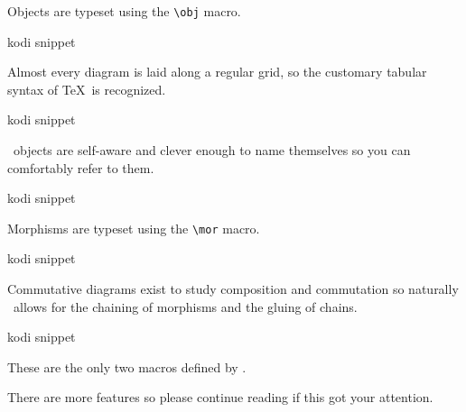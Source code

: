 Objects are typeset using the \lstinline|\obj| macro.

\begin{tcblisting}{kodi snippet}
\nilstrut{}
\end{tcblisting}

Almost every diagram is laid along a regular grid,
so the customary tabular syntax of \TeX\ is recognized.

\begin{tcblisting}{kodi snippet}
\nilstrut{}
\end{tcblisting}

\koDi\ objects are self-aware and clever enough to name themselves
so you can comfortably refer to them.

\begin{tcblisting}{kodi snippet}
\nilstrut{}
\end{tcblisting}

Morphisms are typeset using the \lstinline!\mor! macro.

\begin{tcblisting}{kodi snippet}
\nilstrut{}
\end{tcblisting}

Commutative diagrams exist to study composition and commutation
so naturally \koDi\ allows for the chaining of morphisms and
the gluing of chains.

\begin{tcblisting}{kodi snippet}
\nilstrut{}
\end{tcblisting}

These are the only two macros defined by \koDi.

There are more features so please continue reading if this got your attention.
